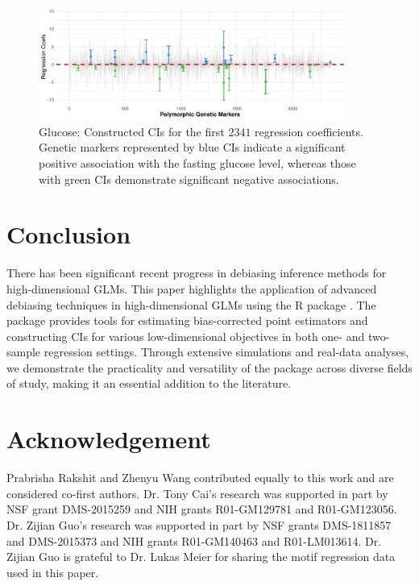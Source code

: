 \begin{figure}[!ht]
\centering
\includegraphics[width = 0.9\textwidth]{CI-Glucose.pdf}
\caption{Glucose: Constructed CIs for the first $2341$ regression coefficients. Genetic markers represented by {\color{NeonBlue} blue} CIs indicate a significant positive association with the fasting glucose level, whereas those with {\color{NeonGreen} green} CIs demonstrate significant negative associations.} 
\label{fig: logistic CI}
\end{figure}

\section{Conclusion}

There has been significant recent progress in debiasing inference methods for high-dimensional GLMs. This paper highlights the application of advanced debiasing techniques in high-dimensional GLMs using the R package . The package provides tools for estimating bias-corrected point estimators and constructing CIs for various low-dimensional objectives in both one- and two-sample regression settings. Through extensive simulations and real-data analyses, we demonstrate the practicality and versatility of the package across diverse fields of study, making it an essential addition to the literature.

\section{Acknowledgement}
Prabrisha Rakshit and Zhenyu Wang contributed equally to this work and are considered co-first authors. Dr. Tony Cai’s research was supported in part by NSF grant DMS-2015259 and NIH grants R01-GM129781 and R01-GM123056. Dr. Zijian Guo’s research was supported in part by NSF grants DMS-1811857 and DMS-2015373 and NIH grants R01-GM140463 and R01-LM013614. Dr. Zijian Guo is grateful to Dr. Lukas Meier for sharing the motif regression data used in this paper.

